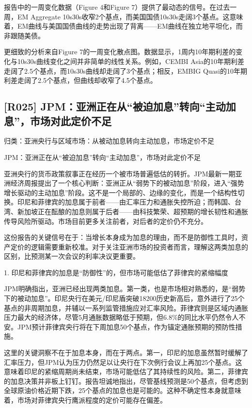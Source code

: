 \documentclass[11pt]{ctexart}
\begin{document}
报告中的一周变化数据（Figure 4和Figure 7）提供了最动态的信号。在过去一周，EM Aggregate 10s30s收窄2个基点，而美国国债10s30s走阔3个基点。这意味着，EM曲线与美国国债曲线的走势出现了背离——EM曲线在独立地平坦化，而非跟随美债。

更细致的分析来自Figure 7的一周变化散点图。数据显示，1周内10年期利差的变化与10s30s曲线变化之间并非简单的线性关系。例如，CEMBI Asia的10年期利差走阔了2.5个基点，而10s30s曲线却走阔了3个基点；相反，EMBIG Quasi的10年期利差走阔了2.5个基点，但曲线却收窄了4.5个基点。

\subsection{[R025] JPM：亚洲正在从“被迫加息”转向“主动加息”，市场对此定价不足}
{\small\color{refgray}归类：亚洲央行与区域市场：从被动加息转向主动加息，市场定价不足}

JPM：亚洲正在从“被迫加息”转向“主动加息”，市场对此定价不足

亚洲央行的货币政策叙事正在经历一个被市场普遍低估的转折。JPM最新一期亚洲经济周报提出了一个核心判断：亚洲正从“弱势下的被动加息”阶段，进入“强势增长驱动的主动加息”阶段。这不是一个局部的、边缘的变化，而是一个结构性切换。印尼和菲律宾的加息属于前者——由汇率压力和通胀失控所迫；而韩国、台湾、新加坡正在酝酿的加息则属于后者——由科技繁荣、超预期的增长韧性和通胀传导风险所驱动。市场目前更多关注前者，对后者的定价仍不充分。

这份报告的关键信号在于：当增长本身成为加息的理由，而不是防御性工具时，资产定价的逻辑需要重新校准。对于关注亚洲市场的投资者而言，理解这两类加息的区别，比预测某一次会议的利率决议更重要。

1. 印尼和菲律宾的加息是“防御性”的，但市场可能低估了菲律宾的紧缩幅度

JPM明确指出，亚洲已经出现两类加息。第一类，也是市场相对熟悉的，是“弱势下的被动加息”。印尼央行在美元/印尼盾突破18200历史新高后，意外进行了25个基点的非周期加息，并辅以一系列监管措施应对汇率风险。菲律宾则是区域内通胀压力最大的经济体，尽管5月通胀数据略低于预期，但6.8\%的同比水平仍然令人不安。JPM预计菲律宾央行将在下周加息50个基点，作为锚定通胀预期的预防性措施。

这里的关键洞察不在于加息本身，而在于两点。第一，印尼的加息虽然暂时缓解了汇率压力，但JPM认为压力仍然足以让央行在下次例行会议上再加25个基点。这意味着印尼的紧缩周期尚未结束，市场可能低估了其持续性的风险。第二，菲律宾的加息决策并非板上钉钉。报告坦诚地指出，尽管基线预测是50个基点，但考虑到全球原油价格近期下跌，25个基点的加息也是可能的。这种不确定性本身就意味着，市场对菲律宾央行鹰派程度的定价可能存在偏差。
\end{document}
